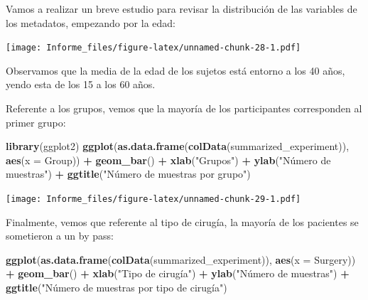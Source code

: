 \documentclass[
]{article}
\newenvironment{Shaded}{\begin{snugshade}}{\end{snugshade}}
\newcommand{\AttributeTok}[1]{\textcolor[rgb]{0.13,0.29,0.53}{#1}}
\newcommand{\FunctionTok}[1]{\textcolor[rgb]{0.13,0.29,0.53}{\textbf{#1}}}
\newcommand{\NormalTok}[1]{#1}
\newcommand{\SpecialCharTok}[1]{\textcolor[rgb]{0.81,0.36,0.00}{\textbf{#1}}}
\newcommand{\StringTok}[1]{\textcolor[rgb]{0.31,0.60,0.02}{#1}}
\begin{document}
Vamos a realizar un breve estudio para revisar la distribución de las
variables de los metadatos, empezando por la edad:

\begin{Shaded}
\end{Shaded}

\texttt{[image: Informe\_files/figure-latex/unnamed-chunk-28-1.pdf]}

Observamos que la media de la edad de los sujetos está entorno a los 40
años, yendo esta de los 15 a los 60 años.

Referente a los grupos, vemos que la mayoría de los participantes
corresponden al primer grupo:

\begin{Shaded}
\begin{Highlighting}[]
\FunctionTok{library}\NormalTok{(ggplot2)}
\FunctionTok{ggplot}\NormalTok{(}\FunctionTok{as.data.frame}\NormalTok{(}\FunctionTok{colData}\NormalTok{(summarized\_experiment)), }\FunctionTok{aes}\NormalTok{(}\AttributeTok{x =}\NormalTok{ Group)) }\SpecialCharTok{+}
  \FunctionTok{geom\_bar}\NormalTok{() }\SpecialCharTok{+} 
  \FunctionTok{xlab}\NormalTok{(}\StringTok{"Grupos"}\NormalTok{) }\SpecialCharTok{+}
  \FunctionTok{ylab}\NormalTok{(}\StringTok{"Número de muestras"}\NormalTok{) }\SpecialCharTok{+}
  \FunctionTok{ggtitle}\NormalTok{(}\StringTok{"Número de muestras por grupo"}\NormalTok{)}
\end{Highlighting}
\end{Shaded}

\texttt{[image: Informe\_files/figure-latex/unnamed-chunk-29-1.pdf]}

Finalmente, vemos que referente al tipo de cirugía, la mayoría de los
pacientes se sometieron a un by pass:

\begin{Shaded}
\begin{Highlighting}[]
\FunctionTok{ggplot}\NormalTok{(}\FunctionTok{as.data.frame}\NormalTok{(}\FunctionTok{colData}\NormalTok{(summarized\_experiment)), }\FunctionTok{aes}\NormalTok{(}\AttributeTok{x =}\NormalTok{ Surgery)) }\SpecialCharTok{+}
  \FunctionTok{geom\_bar}\NormalTok{() }\SpecialCharTok{+} 
  \FunctionTok{xlab}\NormalTok{(}\StringTok{"Tipo de cirugía"}\NormalTok{) }\SpecialCharTok{+}
  \FunctionTok{ylab}\NormalTok{(}\StringTok{"Número de muestras"}\NormalTok{) }\SpecialCharTok{+}
  \FunctionTok{ggtitle}\NormalTok{(}\StringTok{"Número de muestras por tipo de cirugía"}\NormalTok{)}
\end{Highlighting}
\end{Shaded}
\end{document}

